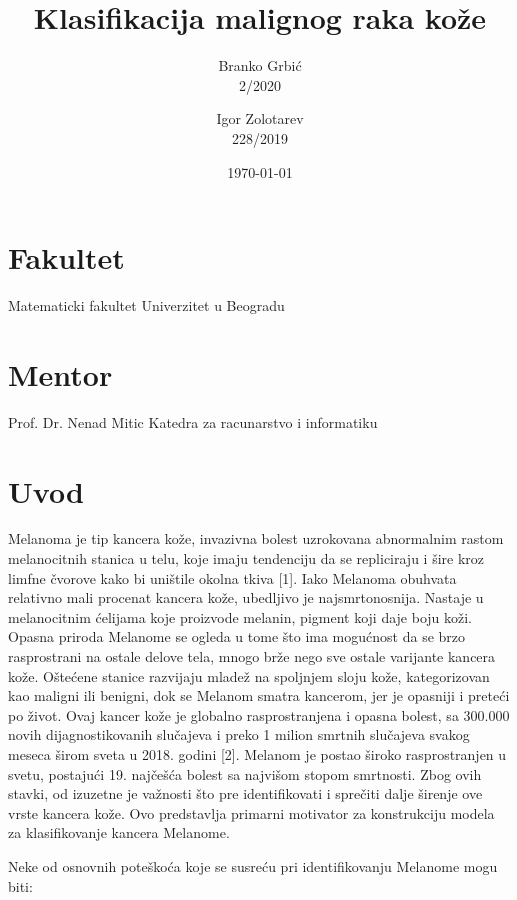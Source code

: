 \documentclass{article}
\title{Klasifikacija malignog raka kože}
\author{
    Branko Grbić \\
    2/2020
    \and 
    Igor Zolotarev \\
    228/2019
}
\date{\today}
\begin{document}
\maketitle


\vfill
\hfill 
\section*{Fakultet}
Matematicki fakultet
\newline
Univerzitet u Beogradu

\section*{Mentor}
 Prof. Dr. Nenad Mitic
 \newline
Katedra za racunarstvo i informatiku

\newpage

\renewcommand{\contentsname}{Sadržaj}
\tableofcontents{}


\newpage
\section{Uvod} 
Melanoma je tip kancera kože, invazivna bolest uzrokovana abnormalnim rastom melanocitnih stanica u telu, koje imaju tendenciju da se repliciraju i šire kroz limfne čvorove kako bi uništile okolna tkiva [1]. Iako Melanoma obuhvata relativno mali procenat kancera kože, ubedljivo je najsmrtonosnija.
Nastaje u melanocitnim ćelijama koje proizvode melanin, pigment koji daje boju koži. Opasna priroda Melanome se ogleda u tome što ima mogućnost da se brzo rasprostrani na ostale delove tela, mnogo brže nego sve ostale varijante kancera kože.
Oštećene stanice razvijaju mladež na spoljnjem sloju kože, kategorizovan kao maligni ili benigni, dok se Melanom smatra kancerom, jer je opasniji i preteći po život. Ovaj kancer kože je globalno rasprostranjena i opasna bolest, sa 300.000 novih dijagnostikovanih slučajeva i preko 1 milion smrtnih slučajeva svakog meseca širom sveta u 2018. godini [2]. Melanom je postao široko rasprostranjen u svetu, postajući 19. najčešća bolest sa najvišom stopom smrtnosti. Zbog ovih stavki, od izuzetne je važnosti što pre identifikovati i sprečiti dalje širenje ove vrste kancera kože. Ovo predstavlja primarni motivator za konstrukciju modela za klasifikovanje kancera Melanome.
\par
Neke od osnovnih poteškoća koje se susreću pri identifikovanju Melanome mogu biti:
\end{document}
